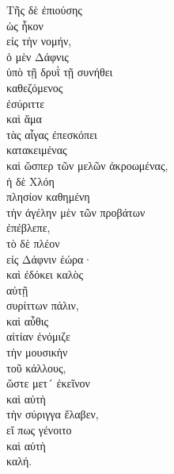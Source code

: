 {\large
\begin{greek}
\noindent Τῆς δὲ ἐπιούσης \\
\tabto{2em} ὡς ἧκον \\
\tabto{4em} εἰς τὴν νομήν, \\
ὁ μὲν Δάφνις \\
\tabto{2em} ὑπὸ τῇ δρυῒ τῇ συνήθει \\
\tabto{4em} καθεζόμενος \\
ἐσύριττε \\
καὶ ἅμα \\
\tabto{4em} τὰς αἶγας ἐπεσκόπει \\
\tabto{6em} κατακειμένας \\
\tabto{6em} καὶ ὥσπερ τῶν μελῶν ἀκροωμένας, \\
ἡ δὲ Χλόη \\
\tabto{2em} πλησίον καθημένη \\
\tabto{2em} τὴν ἀγέλην μὲν τῶν προβάτων \\
ἐπέβλεπε, \\
\tabto{2em} τὸ δὲ πλέον \\
\tabto{2em} εἰς Δάφνιν ἑώρα· \\
καὶ ἐδόκει καλὸς \\
\tabto{2em} αὐτῇ \\
συρίττων πάλιν, \\
καὶ αὖθις \\
\tabto{2em} αἰτίαν ἐνόμιζε \\
\tabto{4em} τὴν μουσικὴν \\
\tabto{6em} τοῦ κάλλους, \\
ὥστε μετ´ ἐκεῖνον \\
\tabto{2em} καὶ αὐτὴ \\
\tabto{2em} τὴν σύριγγα ἔλαβεν, \\
\tabto{4em} εἴ πως γένοιτο \\
\tabto{6em} καὶ αὐτὴ \\
\tabto{4em} καλή.\\

\end{greek}
}

